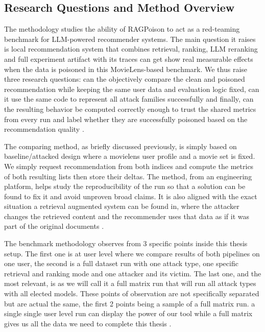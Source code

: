 \subsection{Research Questions and Method Overview}

The methodology studies the ability of RAGPoison to act as a red-teaming benchmark for LLM-powered recommender systems. The main question it raises is local recommendation system that combines retrieval, ranking, LLM reranking and full experiment artifact with its traces can get show real measurable effects when the data is poisoned in this MovieLens-based benchmark. We thus raise three research questions: can the objectively compare the clean and poisoned recommendation while keeping the same user data and evaluation logic fixed, can it use the same code to represent all attack families successfully and finally, can the resulting behavior be computed correctly enough to trust the shared metrics from every run and label whether they are successfully poisoned based on the recommendation quality \cite{ragpoisonlab_repo,li2016factorizationpoison,fang2020influencepoison,nguyen2024manipulatingrecsys}.

The comparing method, as briefly discussed previously, is simply based on baseline/attacked design where a movielens user profile and a movie set is fixed. We simply request recommendation from both indices and compute the metrics of both resulting lists then store their deltas. The method, from an engineering platform, helps study the reproducibility of the run so that a solution can be found to fix it and avoid unproven broad claims. It is also aligned with the exact situation a retrieval augmented system can be found in, where the attacker changes the retrieved content and the recommender uses that data as if it was part of the original documents \cite{ragpoisonlab_repo,zhong2023retrievalcorpora,zou2025poisonedrag_usenix}.

The benchmark methodology observes from 3 specific points inside this thesis setup. The first one is at user level where we compare results of both pipelines on one user, the second is a full dataset run with one attack type, one specific retrieval and ranking mode and one attacker and its victim. The last one, and the most relevant, is as we will call it a full matrix run that will run all attack types with all elected models. These points of observation are not specifically separated but are actual the same, the first 2 points being a sample of a full matrix run. a single single user level run can display the power of our tool while a full matrix gives us all the data we need to complete this thesis \cite{ragpoisonlab_repo}.

